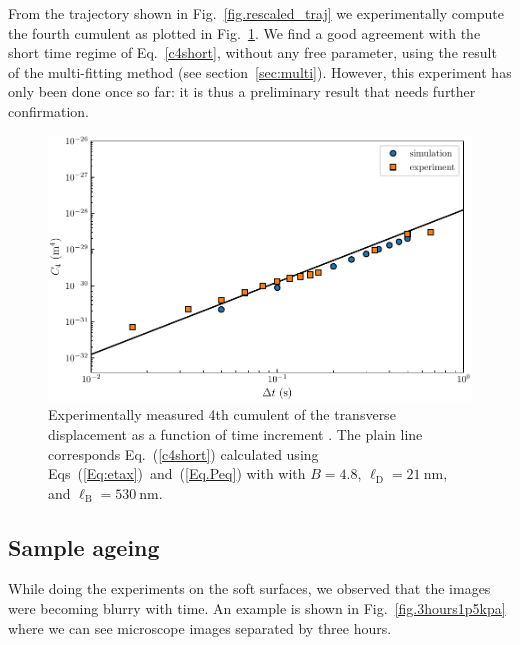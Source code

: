 {From the trajectory shown in Fig.~\ref{fig.rescaled_traj} we experimentally compute the fourth cumulent as plotted in Fig.~\ref{fig.forth}. We find a good agreement with the short time regime of Eq.~\ref{c4short}, without any free parameter, using the result of the multi-fitting method (see section~\ref{sec:multi}). However, this experiment has only been done once so far: it is thus a preliminary result that needs further confirmation.
\begin{figure}[H]
	\centering
	\includegraphics{02_body/chapter4/images/4th_cumulent/c4_exp.pdf}
	\caption{Experimentally measured 4th cumulent of the transverse displacement as a function of time increment . The plain line corresponds Eq.~(\ref{c4short}) calculated using  Eqs~(\ref{Eq:etax})~and~(\ref{Eq.Peq}) with with $B = 4.8$, $\ell_\mathrm{D} = 21 ~ \mathrm{nm}$, and $\ell_\mathrm{B} = 530~\mathrm{nm}$. }
	\label{fig.forth}
\end{figure}
\subsection{Sample ageing}

While doing the experiments on the soft surfaces, we observed that the images were becoming blurry with time. An example is shown in Fig.~\ref{fig.3hours1p5kpa} where we can see microscope images separated by three hours.


}
